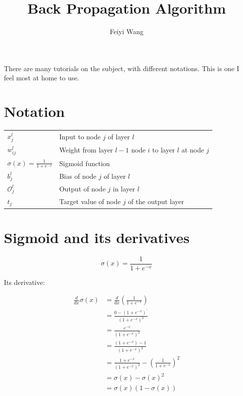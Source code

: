 \documentclass[11pt]{article}
\title{Back Propagation Algorithm}
\author{Feiyi Wang}
\date{}
\begin{document}
\maketitle

There are many tutorials on the subject, with different notations. This is one I feel most at home to use.

\section{Notation}

\begin{tabular}{@{}p{1in}p{4in}}
    $x_j^l$ & Input to node $j$ of layer $l$ \medskip \\

    $w_{ij}^{l}$ & Weight from layer $l-1$ node $i$ to layer $l$ at node $j$ \medskip \\

    $\sigma(x) = \tfrac{1}{1+e^{-x}}$ & Sigmoid function \medskip \\

    $b_j^{l}$ & Bias of node $j$ of layer $l$ \medskip \\

    $\mathcal{O}_{j}^{l}$ & Output of node $j$ in layer $l$ \medskip \\

    $t_j$ & Target value of node $j$ of the output layer \medskip \\


\end{tabular}


\section{Sigmoid and its derivatives}

\begin{equation}
    \sigma(x) = \frac{1}{1+e^{-x}}
\end{equation}

Its derivative:

\begin{align*}
\frac{d}{dx}\sigma(x) &= \frac{d}{dx} \left(\frac{1}{1+e^{-x}}\right) \\
    &= \frac{0 - (1+e^{-x})^\prime}{(1+e^{-x})^2} \\
    &= \frac{e^{-x}}{(1+e^{-x})^2} \\
    &= \frac{(1 + e^{-x}) - 1}{(1+e^{-x})^2} \\
    &= \frac{1+e^{-x}}{(1+e^{-x})^2} - \left( \frac{1}{1+e^{-x}} \right)^2 \\
    &= \sigma(x) - \sigma(x)^2  \\
    &= \sigma(x)(1-\sigma(x)) \\
\end{align*}
\end{document}
